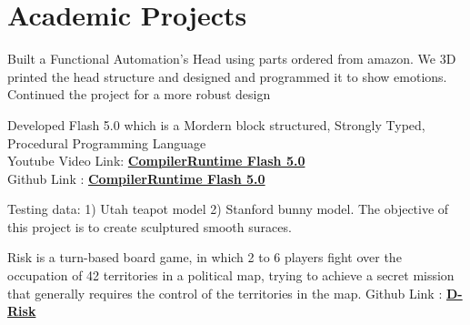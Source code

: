 \documentclass[hidelinks,letterpaper]{deedy-resume-openfont} %
\begin{document}
\begin{minipage}[t]{0.66\textwidth}
		\vspace{-0.25cm}
		\section{Academic Projects}
		
		
		\footnotesize Built a Functional Automation’s Head using parts ordered from amazon. We 3D printed the head
		structure and designed and programmed it to show emotions. Continued the project for a more robust
		design
		
		\sectionsep
		
		
		\footnotesize Developed Flash 5.0 which is a Mordern block structured, Strongly Typed, Procedural Programming Language\\
		Youtube Video Link: \href{https://www.youtube.com/watch?v=cSMFHlU0nXk}{\bf CompilerRuntime Flash 5.0} \\
		Github Link : \href{https://github.com/anantsrivastava30/CompilerRuntime}{\bf CompilerRuntime Flash 5.0}  
		
		\sectionsep
		
		\footnotesize Testing data: 1) Utah teapot model 2) Stanford bunny model. The objective of this project is to create sculptured smooth suraces.
		
		\sectionsep
		
		\footnotesize Risk is a turn-based board game, in which 2 to 6 players fight over the occupation of 42 territories in a political map, trying to achieve a secret mission that generally requires the control of the territories in the map. Github Link : \href{https://github.com/ser515asu/DRisk-Team-MASCS/tree/master/riskmap}{\bf D-Risk}  
		

\end{minipage}
\end{document}
